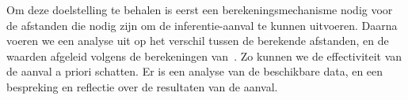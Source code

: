 Om deze doelstelling te behalen is eerst een berekeningsmechanisme nodig voor
de afstanden die nodig zijn om de inferentie-aanval te kunnen uitvoeren. Daarna
voeren we een analyse uit op het verschil tussen de berekende afstanden, en de
waarden afgeleid volgens de berekeningen van~\citeauthor{Dhondt}. Zo kunnen we
de effectiviteit van de aanval a priori schatten. Er is een analyse van de
beschikbare data, en een bespreking en reflectie over de resultaten van de
aanval.